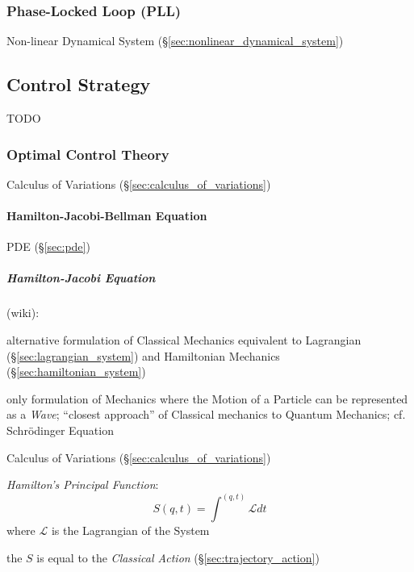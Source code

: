 \subsubsection{Phase-Locked Loop (PLL)}\label{sec:pll}

Non-linear Dynamical System (\S\ref{sec:nonlinear_dynamical_system})



\subsection{Control Strategy}\label{sec:control_strategy}

TODO



\subsubsection{Optimal Control Theory}\label{sec:optimal_control}

\fist Calculus of Variations (\S\ref{sec:calculus_of_variations})



\paragraph{Hamilton-Jacobi-Bellman Equation}
\label{sec:hamilton_jacobi_bellman}\hfill

PDE (\S\ref{sec:pde})



\subparagraph{Hamilton-Jacobi Equation}\label{sec:hamilton_jacobi}\hfill

(wiki):

alternative formulation of Classical Mechanics equivalent to Lagrangian
(\S\ref{sec:lagrangian_system}) and Hamiltonian Mechanics
(\S\ref{sec:hamiltonian_system})

only formulation of Mechanics where the Motion of a Particle can be represented
as a \emph{Wave}; ``closest approach'' of Classical mechanics to Quantum
Mechanics; cf. Schr\"odinger Equation

\fist Calculus of Variations (\S\ref{sec:calculus_of_variations})

\emph{Hamilton's Principal Function}:
\[
  S(q,t) = \int^{(q,t)} \mathcal{L} dt
\]
where $\mathcal{L}$ is the Lagrangian of the System

the $S$ is equal to the \emph{Classical Action} (\S\ref{sec:trajectory_action})

